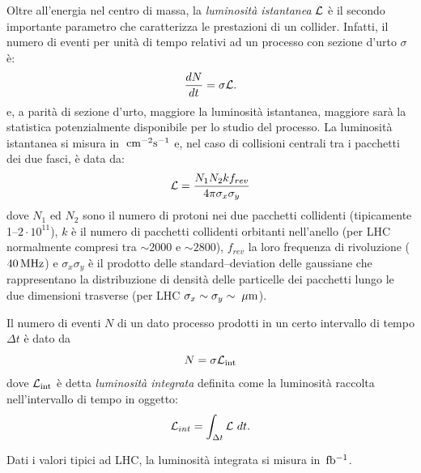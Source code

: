 Oltre all'energia nel centro di massa, la {\em luminosit\`{a} istantanea} ${\cal L}$ \`e il secondo importante parametro che
caratterizza le prestazioni di un collider. Infatti, il numero di eventi per unit\`a di tempo relativi ad un processo con sezione d'urto $\sigma$ \`e:
\begin{equation}
     \frac{dN}{dt} = \sigma {\cal L}.
\end{equation}
e, a parit\`a di sezione d'urto, maggiore la luminosit\`a istantanea, maggiore sar\`a la statistica potenzialmente disponibile per lo studio del processo. La luminosit\`a istantanea si misura in $\rm \; cm^{-2}{\mathrm s}^{-1}$ e, nel caso di collisioni centrali tra i pacchetti dei due
fasci, \`e data da:
\begin{equation}
   \label{for:luminos}
   {\cal L} = \frac{N_{1} N_{2} k f_{rev}}{4\pi \sigma _{x} \sigma _{y}}
\end{equation}
dove $N_{1}$ ed $N_{2}$ sono il numero di protoni nei due pacchetti collidenti (tipicamente 1--$2\cdot10^{11}$), $k$ \`e il numero di pacchetti collidenti orbitanti nell'anello (per LHC normalmente compresi tra $\sim 2000$ e $\sim 2800$), $f_{rev}$ la loro frequenza di rivoluzione ($40{\rm \, MHz}$) e $\sigma_{x} \sigma_{y}$ \`e il prodotto delle standard--deviation delle gaussiane che rappresentano la distribuzione di densit\`a delle particelle dei pacchetti lungo le due dimensioni trasverse (per LHC $\sigma_{x}\sim\sigma_{y}\sim\; \mu \rm m$).

Il numero di eventi $N$  di un dato processo prodotti in un certo intervallo di tempo $\Delta t$ \`e dato da 
\begin{equation}
     N = \sigma {\cal L}_{\rm int}
\end{equation}
dove ${\cal L}_{\rm int}$ \`e detta {\em luminosit\`{a} integrata} definita come la luminosit\`a raccolta nell'intervallo di tempo in oggetto:
\begin{equation}
   {\cal L}_{int} = \int_{\Delta t} {\cal L}\ dt.
\end{equation}

Dati i valori tipici ad LHC, la luminosit\`a integrata si misura in ${\rm \, fb^{-1}}$.

